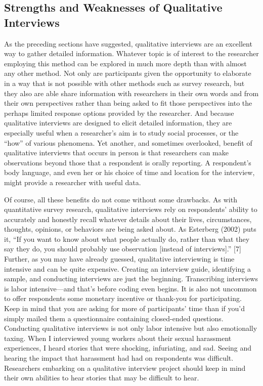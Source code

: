 \subsection{Strengths and Weaknesses of Qualitative Interviews}

As the preceding sections have suggested, qualitative interviews are an excellent way to gather detailed information. Whatever topic is of interest to the researcher employing this method can be explored in much more depth than with almost any other method. Not only are participants given the opportunity to elaborate in a way that is not possible with other methods such as survey research, but they also are able share information with researchers in their own words and from their own perspectives rather than being asked to fit those perspectives into the perhaps limited response options provided by the researcher. And because qualitative interviews are designed to elicit detailed information, they are especially useful when a researcher’s aim is to study social processes, or the “how” of various phenomena. Yet another, and sometimes overlooked, benefit of qualitative interviews that occurs in person is that researchers can make observations beyond those that a respondent is orally reporting. A respondent’s body language, and even her or his choice of time and location for the interview, might provide a researcher with useful data.

Of course, all these benefits do not come without some drawbacks. As with quantitative survey research, qualitative interviews rely on respondents’ ability to accurately and honestly recall whatever details about their lives, circumstances, thoughts, opinions, or behaviors are being asked about. As Esterberg (2002) puts it, “If you want to know about what people actually do, rather than what they say they do, you should probably use observation [instead of interviews].” [7] Further, as you may have already guessed, qualitative interviewing is time intensive and can be quite expensive. Creating an interview guide, identifying a sample, and conducting interviews are just the beginning. Transcribing interviews is labor intensive—and that’s before coding even begins. It is also not uncommon to offer respondents some monetary incentive or thank-you for participating. Keep in mind that you are asking for more of participants’ time than if you’d simply mailed them a questionnaire containing closed-ended questions. Conducting qualitative interviews is not only labor intensive but also emotionally taxing. When I interviewed young workers about their sexual harassment experiences, I heard stories that were shocking, infuriating, and sad. Seeing and hearing the impact that harassment had had on respondents was difficult. Researchers embarking on a qualitative interview project should keep in mind their own abilities to hear stories that may be difficult to hear.
